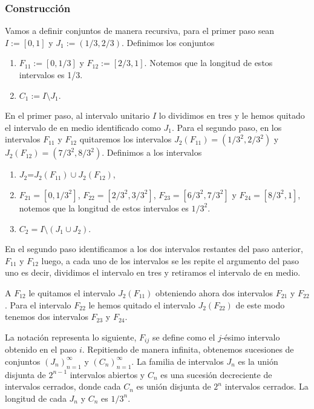 \subsubsection{Construcción}
Vamos a definir conjuntos de manera recursiva, para el primer paso  sean $I:=[0,1]$ y $J_1:=(1/3,2/3)$. Definimos los conjuntos

\begin{enumerate}
\item $F_{11} := [0,1/3]$ y $F_{12} := [2/3,1]$. Notemos que la longitud de estos intervalos es 1/3.
\item $C_1 := I \setminus J_1$. 
\end{enumerate} 

En el primer paso, al intervalo unitario $I$ lo dividimos en tres y  le hemos quitado el intervalo de en medio identificado como $J_1$.
Para el segundo paso, en los intervalos $F_{11}$ y $F_{12}$ quitaremos los intervalos $J_2(F_{11})=(1/3^2,2/3^2)$ y $J_2(F_{12})=(7/3^2,8/3^2)$. Definimos a los intervalos

\begin{enumerate}
\item $J_2$=$J_2(F_{11}) \cup J_2(F_{12})$,
\item $F_{21}=[0,1/3^2]$,  $F_{22}=[2/3^2,3/3^2]$, $F_{23}=[6/3^2,7/3^2]$ y $F_{24}=[8/3^2,1]$, notemos que la longitud de estos intervalos es $1/3^2$.
\item $C_2=I \setminus (J_1 \cup J_2)$. 
\end{enumerate}

En el segundo paso identificamos a los dos intervalos restantes del paso anterior, $F_{11}$ y $F_{12}$ luego, a cada uno de los intervalos se les repite el argumento del paso uno es decir, dividimos el intervalo en tres y retiramos el intervalo de en medio.

A $F_{12}$ le quitamos el intervalo $J_2(F_{11})$ obteniendo ahora dos intervalos $F_{21}$ y $F_{22}$. Para el intervalo $F_{22}$ le hemos quitado el intervalo $J_2(F_{22})$ de este modo tenemos dos intervalos $F_{23}$ y $F_{24}$.


La notación representa lo siguiente, $F_{ij}$ se define como el $j$-ésimo intervalo obtenido en el paso $i$. Repitiendo de manera infinita, obtenemos sucesiones de conjuntos $(J_n)_{n=1}^\infty$ y $(C_n)_{n=1}^\infty$. La familia de intervalos $J_n$ es la unión disjunta de $2^{n-1}$ intervalos abiertos y $C_n$ es una sucesión decreciente de intervalos cerrados, donde cada $C_n$ es unión disjunta de $2^n$ intervalos cerrados. La longitud de cada $J_n$ y $C_n$ es $1/3^n.$

